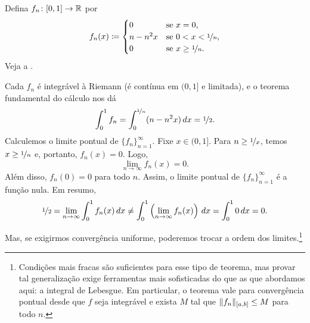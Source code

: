 \begin{example}
Defina $f_n \colon [0,1] \to {\mathbb{R}}$ por
\begin{equation*}
f_n(x) \coloneqq
\begin{cases}
0 &  \text{se } x = 0,\\
n-n^2x &  \text{se } 0 < x < \nicefrac{1}{n},\\
0 &  \text{se } x \geq \nicefrac{1}{n}.
\end{cases}
\avoidbreak
\end{equation*}
Veja a .

\begin{myfigureht}
\caption{Gráfico de $f_n(x)$.%
\label{intconvcntr:fig}}
\end{myfigureht}

Cada $f_n$ é integrável à Riemann (é contínua em $(0,1]$ e limitada), e o
teorema fundamental do cálculo nos dá
\begin{equation*}
\int_0^1 f_n =
\int_0^{\nicefrac{1}{n}} (n-n^2x)\,dx = \nicefrac{1}{2} .
\end{equation*}
Calculemos o limite pontual de $\{ f_n \}_{n=1}^\infty$.
Fixe $x \in (0,1]$. Para $n \geq \nicefrac{1}{x}$,
temos $x \geq \nicefrac{1}{n}$ e, portanto, $f_n(x) = 0$. Logo,
\begin{equation*}
\lim_{n \to \infty} f_n(x) = 0.
\end{equation*}
Além disso, $f_n(0) = 0$ para todo $n$. Assim, o limite pontual de
$\{ f_n \}_{n=1}^\infty$ é a função nula. Em resumo,
\begin{equation*}
\nicefrac{1}{2} =
\lim_{n\to\infty}
\int_0^1 f_n (x)\,dx
\neq
\int_0^1
\left(
\lim_{n\to\infty}
f_n(x)\right)\,dx
=
\int_0^1 0\,dx = 0 .
\end{equation*}
\end{example}

Mas, se exigirmos convergência uniforme, poderemos trocar a ordem dos
limites.\footnote{Condições mais fracas são suficientes para esse tipo de
teorema, mas provar tal generalização exige ferramentas mais sofisticadas
do que as que abordamos aqui: a integral de Lebesgue. Em particular, o
teorema vale para convergência pontual desde que $f$ seja integrável e
exista $M$ tal que $\lVert {f_n} \rVert_{[a,b]} \leq M$ para todo $n$.}

